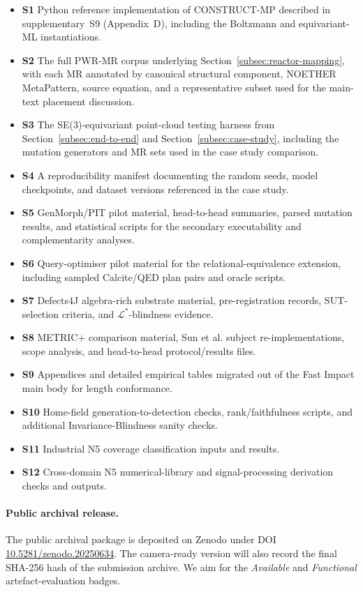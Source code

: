 \documentclass[manuscript]{acmart}
\begin{document}
\begin{itemize}
    \item \textbf{S1} Python reference implementation of CONSTRUCT-MP described in supplementary~S9 (Appendix~D), including the Boltzmann and equivariant-ML instantiations.
    \item \textbf{S2} The full PWR-MR corpus underlying Section~\ref{subsec:reactor-mapping}, with each MR annotated by canonical structural component, NOETHER MetaPattern, source equation, and a representative subset used for the main-text placement discussion.
    \item \textbf{S3} The SE(3)-equivariant point-cloud testing harness from Section~\ref{subsec:end-to-end} and Section~\ref{subsec:case-study}, including the mutation generators and MR sets used in the case study comparison.
    \item \textbf{S4} A reproducibility manifest documenting the random seeds, model checkpoints, and dataset versions referenced in the case study.
    \item \textbf{S5} GenMorph/PIT pilot material, head-to-head summaries, parsed mutation results, and statistical scripts for the secondary executability and complementarity analyses.
    \item \textbf{S6} Query-optimiser pilot material for the relational-equivalence extension, including sampled Calcite/QED plan pairs and oracle scripts.
    \item \textbf{S7} Defects4J algebra-rich substrate material, pre-registration records, SUT-selection criteria, and $\mathcal{L}^{*}$-blindness evidence.
    \item \textbf{S8} METRIC+ comparison material, Sun et al. subject re-implementations, scope analysis, and head-to-head protocol/results files.
    \item \textbf{S9} Appendices and detailed empirical tables migrated out of the Fast Impact main body for length conformance.
    \item \textbf{S10} Home-field generation-to-detection checks, rank/faithfulness scripts, and additional Invariance-Blindness sanity checks.
    \item \textbf{S11} Industrial N5 coverage classification inputs and results.
    \item \textbf{S12} Cross-domain N5 numerical-library and signal-processing derivation checks and outputs.
\end{itemize}

\paragraph{Public archival release.} The public archival package is deposited
on Zenodo under DOI
\href{https://doi.org/10.5281/zenodo.20250634}{10.5281/zenodo.20250634}. The
camera-ready version will also record the final SHA-256 hash of the
submission archive. We aim for the \emph{Available} and \emph{Functional}
artefact-evaluation badges.
\end{document}
